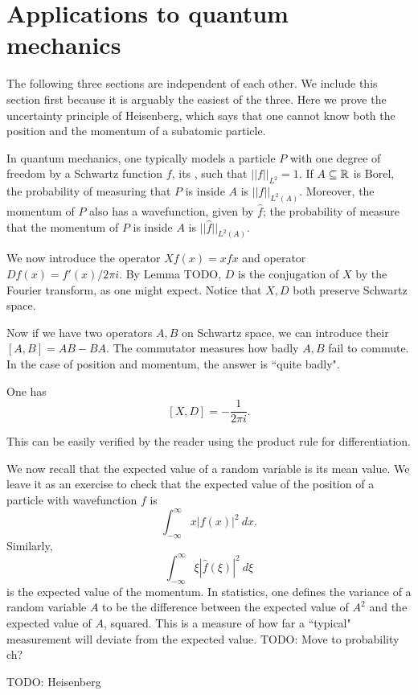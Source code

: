 \section{Applications to quantum mechanics}
The following three sections are independent of each other. We include this section first because it is arguably the easiest of the three.
Here we prove the uncertainty principle of Heisenberg, which says that one cannot know both the position and the momentum of a subatomic particle.

In quantum mechanics, one typically models a particle $P$ with one degree of freedom by a Schwartz function $f$, its , such that $||f||_{L^2} = 1$.
If $A \subseteq \mathbb{R}$ is Borel, the probability of measuring that $P$ is inside $A$ is $||f||_{L^2(A)}$.
Moreover, the momentum of $P$ also has a wavefunction, given by $\hat f$; the probability of measure that the momentum of $P$ is inside $A$ is $||\hat f||_{L^2(A)}$.

We now introduce the  operator $Xf(x) = xfx$ and  operator $Df(x) = f'(x)/2\pi i$. By Lemma TODO, $D$ is the conjugation of $X$ by the Fourier transform, as one might expect. Notice that $X,D$ both preserve Schwartz space.

Now if we have two operators $A,B$ on Schwartz space, we can introduce their  $[A,B] = AB - BA$. The commutator measures how badly $A,B$ fail to commute.
In the case of position and momentum, the answer is ``quite badly".

\begin{theorem}
One has
$$[X, D] = -\frac{1}{2\pi i}.$$
\end{theorem}
This can be easily verified by the reader using the product rule for differentiation.

We now recall that the expected value of a random variable is its mean value. We leave it as an exercise to check that the expected value of the position of a particle with wavefunction $f$ is
$$\int_{-\infty}^\infty x|f(x)|^2~dx.$$
Similarly,
$$\int_{-\infty}^\infty \xi|\hat f(\xi)|^2~d\xi$$
is the expected value of the momentum.
In statistics, one defines the variance of a random variable $A$ to be the difference between the expected value of $A^2$ and the expected value of $A$, squared.
This is a measure of how far a ``typical" measurement will deviate from the expected value.
TODO: Move to probability ch?

TODO: Heisenberg

